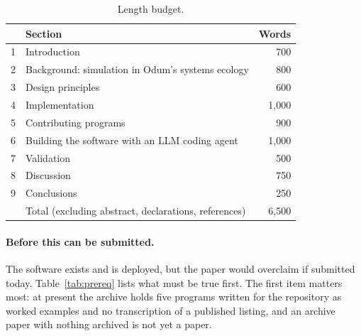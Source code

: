 \begin{table}[h]
\centering\small
\begin{tabular}{@{}llr@{}}
\toprule
& Section & Words \\
\midrule
1 & Introduction & 700 \\
2 & Background: simulation in Odum's systems ecology & 800 \\
3 & Design principles & 600 \\
4 & Implementation & 1{,}000 \\
5 & Contributing programs & 900 \\
6 & Building the software with an LLM coding agent & 1{,}000 \\
7 & Validation & 500 \\
8 & Discussion & 750 \\
9 & Conclusions & 250 \\
\midrule
& Total (excluding abstract, declarations, references) & 6{,}500 \\
\bottomrule
\end{tabular}
\caption{Length budget.}
\end{table}

\paragraph{Before this can be submitted.} The software exists and is deployed, but the paper would overclaim if submitted today. Table~\ref{tab:prereq} lists what must be true first. The first item matters most: at present the archive holds five programs written for the repository as worked examples and no transcription of a published listing, and an archive paper with nothing archived is not yet a paper.

